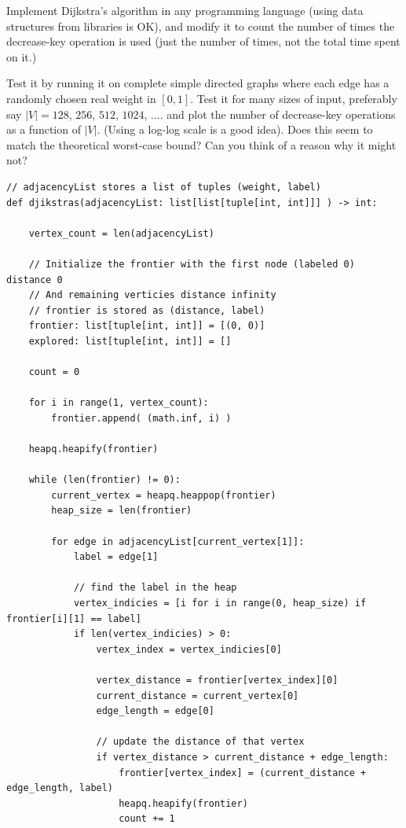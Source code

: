 \documentclass[12pt, letterpaper]{article}
\begin{document}
\begin{enumerate}
Implement Dijkstra's algorithm in any programming language (using data structures from libraries is OK), and modify
it to count
the number of times the decrease-key operation is used (just the number of times, not the total time spent on it.)

Test it by running it on complete simple directed graphs where each edge has a randomly chosen real weight in $[0,1]$.  
Test it for many sizes of input, preferably  say $|V|=128$, $256$, $512$, $1024$, ....    
and plot the number of decrease-key operations  as a function of $|V|$. (Using a log-log scale is a good idea).  Does this seem to match the theoretical worst-case bound?  Can you think of a reason why it might not?

\begin{lstlisting}
// adjacencyList stores a list of tuples (weight, label)
def djikstras(adjacencyList: list[list[tuple[int, int]]] ) -> int:

    vertex_count = len(adjacencyList)

    // Initialize the frontier with the first node (labeled 0) distance 0
    // And remaining verticies distance infinity
    // frontier is stored as (distance, label)
    frontier: list[tuple[int, int]] = [(0, 0)]
    explored: list[tuple[int, int]] = []

    count = 0

    for i in range(1, vertex_count):
        frontier.append( (math.inf, i) )

    heapq.heapify(frontier)

    while (len(frontier) != 0):
        current_vertex = heapq.heappop(frontier)
        heap_size = len(frontier)

        for edge in adjacencyList[current_vertex[1]]:
            label = edge[1]

            // find the label in the heap
            vertex_indicies = [i for i in range(0, heap_size) if frontier[i][1] == label]
            if len(vertex_indicies) > 0:
                vertex_index = vertex_indicies[0]

                vertex_distance = frontier[vertex_index][0]
                current_distance = current_vertex[0]
                edge_length = edge[0]

                // update the distance of that vertex
                if vertex_distance > current_distance + edge_length:
                    frontier[vertex_index] = (current_distance + edge_length, label)
                    heapq.heapify(frontier)
                    count += 1
    

\end{lstlisting}
\end{enumerate}
\end{document}
